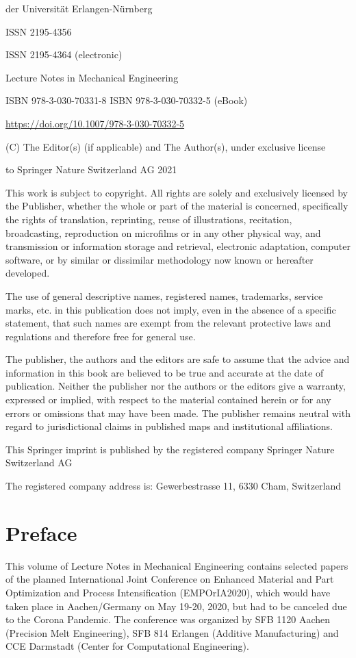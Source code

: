 \documentclass[10pt]{article}
\begin{document}
der Universität Erlangen-Nürnberg

ISSN 2195-4356

ISSN 2195-4364 (electronic)

Lecture Notes in Mechanical Engineering

ISBN 978-3-030-70331-8 ISBN 978-3-030-70332-5 (eBook)

\href{https://doi.org/10.1007/978-3-030-70332-5}{https://doi.org/10.1007/978-3-030-70332-5}

(C) The Editor(s) (if applicable) and The Author(s), under exclusive license

to Springer Nature Switzerland AG 2021

This work is subject to copyright. All rights are solely and exclusively licensed by the Publisher, whether the whole or part of the material is concerned, specifically the rights of translation, reprinting, reuse of illustrations, recitation, broadcasting, reproduction on microfilms or in any other physical way, and transmission or information storage and retrieval, electronic adaptation, computer software, or by similar or dissimilar methodology now known or hereafter developed.

The use of general descriptive names, registered names, trademarks, service marks, etc. in this publication does not imply, even in the absence of a specific statement, that such names are exempt from the relevant protective laws and regulations and therefore free for general use.

The publisher, the authors and the editors are safe to assume that the advice and information in this book are believed to be true and accurate at the date of publication. Neither the publisher nor the authors or the editors give a warranty, expressed or implied, with respect to the material contained herein or for any errors or omissions that may have been made. The publisher remains neutral with regard to jurisdictional claims in published maps and institutional affiliations.

This Springer imprint is published by the registered company Springer Nature Switzerland AG

The registered company address is: Gewerbestrasse 11, 6330 Cham, Switzerland

\section*{Preface}
This volume of Lecture Notes in Mechanical Engineering contains selected papers of the planned International Joint Conference on Enhanced Material and Part Optimization and Process Intensification (EMPOrIA2020), which would have taken place in Aachen/Germany on May 19-20, 2020, but had to be canceled due to the Corona Pandemic. The conference was organized by SFB 1120 Aachen (Precision Melt Engineering), SFB 814 Erlangen (Additive Manufacturing) and CCE Darmstadt (Center for Computational Engineering).
\end{document}

